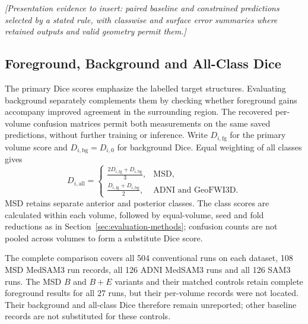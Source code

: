 \documentclass[12pt,a4paper]{article}
\begin{document}
\noindent\textit{[Presentation evidence to insert: paired baseline and
constrained predictions selected by a stated rule, with classwise and
surface error summaries where retained outputs and valid geometry permit them.]}

\FloatBarrier
\FloatBarrier
\subsection{Foreground, Background and All-Class Dice}
\label{sec:background-dice-results}

The primary Dice scores emphasize the labelled target structures.
Evaluating background separately complements them by checking whether
foreground gains accompany improved agreement in the surrounding region.
The recovered per-volume confusion matrices permit both measurements
on the same saved predictions, without further training or inference.
Write $D_{i,\mathrm{fg}}$ for the primary volume score and
$D_{i,\mathrm{bg}}=D_{i,0}$ for background Dice. Equal weighting of
all classes gives
\begin{equation}
D_{i,\mathrm{all}}=
\begin{cases}
\displaystyle\frac{2D_{i,\mathrm{fg}}+D_{i,\mathrm{bg}}}{3},
 & \text{MSD},\\[.6em]
\displaystyle\frac{D_{i,\mathrm{fg}}+D_{i,\mathrm{bg}}}{2},
 & \text{ADNI and GeoFWI3D}.
\end{cases}
\label{eq:reported-all-class-dice}
\end{equation}
MSD retains separate anterior and posterior classes. The class scores
are calculated within each volume, followed by equal-volume, seed and
fold reductions as in Section~\ref{sec:evaluation-methods}; confusion
counts are not pooled across volumes to form a substitute Dice score.

The complete comparison covers all 504 conventional runs on each
dataset, 108 MSD MedSAM3 run records, all 126 ADNI MedSAM3 runs
and all 126 SAM3 runs.
The MSD $B$ and $B+E$ variants and their matched controls retain complete
foreground results for all 27 runs, but their per-volume records were
not located. Their background and all-class Dice therefore remain
unreported; other baseline records are not substituted for these controls.
\end{document}
